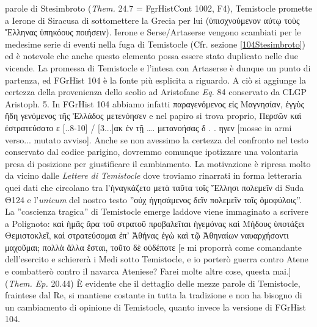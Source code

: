 {parole di Stesimbroto (\emph{Them.}   24.7 = FgrHistCont 1002, F4), Temistocle promette a Ierone di Siracusa di sottomettere la Grecia per lui (\textgreek{ὑπισχνούμενον αὐτῳ τοὺς Ἕλληνας ὑπηκόους ποιήσειν}). Ierone e Serse/Artaserse  vengono scambiati per le medesime serie di eventi nella fuga di Temistocle (Cfr. sezione \ref{104Stesimbroto}) ed è notevole che anche questo elemento possa essere stato duplicato nelle due vicende.
            La promessa di Temistocle e l'intesa con Artaserse  è dunque un punto di partenza, ed FGrHist 104 è la fonte più esplicita a riguardo. A ciò si aggiunge la certezza della provenienza dello scolio ad Aristofane  \emph{Eq.} 84 conservato da CLGP Aristoph. 5. In FGrHist 104 abbiamo infatti \textgreek{παραγενόμενος εἰς Μαγνησίαν, ἐγγὺς ἤδη γενόμενος τῆς Ἑλλάδος μετενόησεν} e nel papiro si trova proprio, \textgreek{ Περσῶν καὶ ἐστρατεύσατο ε [..8-10] / [3...]ακ ἐν τῇ …. μετανοήσας δ . . ηγεν} [mosse in armi verso... mutato avviso]. Anche se non avessimo la certezza del confronto nel testo conservato dal codice parigino, dovremmo comunque ipotizzare una volontaria presa di posizione per giustificare il cambiamento. La motivazione è ripresa molto da vicino dalle \emph{Lettere di Temistocle} dove troviamo rinarrati in forma letteraria quei dati che circolano tra l'\textgreek{ἠναγκάζετο μετὰ ταῦτα τοῖς Ἕλλησι πολεμεῖν} di Suda \textgreek{Θ}124 e l'\emph{unicum }del nostro testo ''\textgreek{οὐχ ἡγησάμενος δεῖν πολεμεῖν τοῖς ὁμοφύλοις}''. La ''coscienza tragica'' di Temistocle emerge laddove viene immaginato a scrivere a Polignoto: \textgreek{καὶ ἡμᾶς ἄρα τοῦ στρατοῦ προβαλεῖται ἡγεμόνας καὶ Μήδους ὑποτάξει Θεμιστοκλεῖ, καὶ στρατεύσομαι ἐπ’ Ἀθήνας ἐγὼ καὶ τῷ Ἀθηναίων ναυαρχήσοντι μαχοῦμαι; πολλὰ ἄλλα ἔσται, τοῦτο δὲ οὐδέποτε} [e mi proporrà come comandante dell'esercito e schiererà i Medi sotto Temistocle, e io porterò guerra contro Atene e combatterò  contro il navarca Ateniese? Farei molte altre cose, questa mai.] (\emph{Them. Ep.}  20.44) È evidente che il dettaglio delle mezze parole di Temistocle, fraintese dal Re, si mantiene costante in tutta la tradizione e non ha bisogno di un cambiamento di opinione di Temistocle, quanto invece la versione di FGrHist 104. 
}
